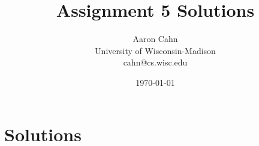 \documentclass[12pt]{article}
\begin{document}
\title{Assignment 5 Solutions}
\date{\today}



\author{
Aaron Cahn\\
University of Wisconsin-Madison\\
cahn@cs.wisc.edu
}

\maketitle

\newpage
\section{Solutions} \label{sec:solutions} 

%
%
\end{document}
